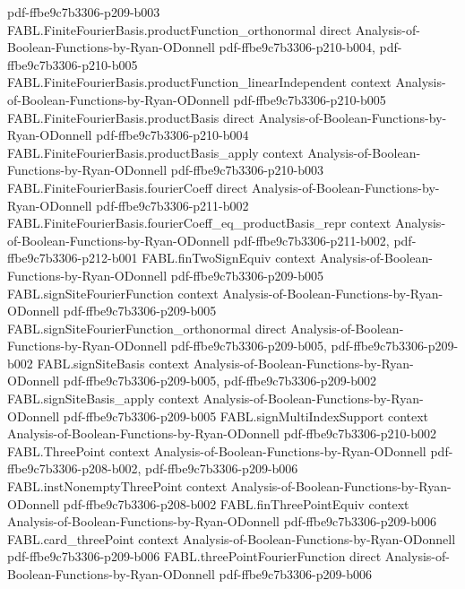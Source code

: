 \begin{theorem}
  {pdf-ffbe9c7b3306-p209-b003}
\proofstep
  {FABL.FiniteFourierBasis.productFunction_orthonormal}
  {direct}
  {Analysis-of-Boolean-Functions-by-Ryan-ODonnell}
  {pdf-ffbe9c7b3306-p210-b004,
    pdf-ffbe9c7b3306-p210-b005}
\proofstep
  {FABL.FiniteFourierBasis.productFunction_linearIndependent}
  {context}
  {Analysis-of-Boolean-Functions-by-Ryan-ODonnell}
  {pdf-ffbe9c7b3306-p210-b005}
\proofstep
  {FABL.FiniteFourierBasis.productBasis}
  {direct}
  {Analysis-of-Boolean-Functions-by-Ryan-ODonnell}
  {pdf-ffbe9c7b3306-p210-b004}
\proofstep
  {FABL.FiniteFourierBasis.productBasis_apply}
  {context}
  {Analysis-of-Boolean-Functions-by-Ryan-ODonnell}
  {pdf-ffbe9c7b3306-p210-b003}
\proofstep
  {FABL.FiniteFourierBasis.fourierCoeff}
  {direct}
  {Analysis-of-Boolean-Functions-by-Ryan-ODonnell}
  {pdf-ffbe9c7b3306-p211-b002}
\proofstep
  {FABL.FiniteFourierBasis.fourierCoeff_eq_productBasis_repr}
  {context}
  {Analysis-of-Boolean-Functions-by-Ryan-ODonnell}
  {pdf-ffbe9c7b3306-p211-b002,
    pdf-ffbe9c7b3306-p212-b001}
\proofstep
  {FABL.finTwoSignEquiv}
  {context}
  {Analysis-of-Boolean-Functions-by-Ryan-ODonnell}
  {pdf-ffbe9c7b3306-p209-b005}
\proofstep
  {FABL.signSiteFourierFunction}
  {context}
  {Analysis-of-Boolean-Functions-by-Ryan-ODonnell}
  {pdf-ffbe9c7b3306-p209-b005}
\proofstep
  {FABL.signSiteFourierFunction_orthonormal}
  {direct}
  {Analysis-of-Boolean-Functions-by-Ryan-ODonnell}
  {pdf-ffbe9c7b3306-p209-b005,
    pdf-ffbe9c7b3306-p209-b002}
\proofstep
  {FABL.signSiteBasis}
  {context}
  {Analysis-of-Boolean-Functions-by-Ryan-ODonnell}
  {pdf-ffbe9c7b3306-p209-b005,
    pdf-ffbe9c7b3306-p209-b002}
\proofstep
  {FABL.signSiteBasis_apply}
  {context}
  {Analysis-of-Boolean-Functions-by-Ryan-ODonnell}
  {pdf-ffbe9c7b3306-p209-b005}
\proofstep
  {FABL.signMultiIndexSupport}
  {context}
  {Analysis-of-Boolean-Functions-by-Ryan-ODonnell}
  {pdf-ffbe9c7b3306-p210-b002}
\proofstep
  {FABL.ThreePoint}
  {context}
  {Analysis-of-Boolean-Functions-by-Ryan-ODonnell}
  {pdf-ffbe9c7b3306-p208-b002,
    pdf-ffbe9c7b3306-p209-b006}
\proofstep
  {FABL.instNonemptyThreePoint}
  {context}
  {Analysis-of-Boolean-Functions-by-Ryan-ODonnell}
  {pdf-ffbe9c7b3306-p208-b002}
\proofstep
  {FABL.finThreePointEquiv}
  {context}
  {Analysis-of-Boolean-Functions-by-Ryan-ODonnell}
  {pdf-ffbe9c7b3306-p209-b006}
\proofstep
  {FABL.card_threePoint}
  {context}
  {Analysis-of-Boolean-Functions-by-Ryan-ODonnell}
  {pdf-ffbe9c7b3306-p209-b006}
\proofstep
  {FABL.threePointFourierFunction}
  {direct}
  {Analysis-of-Boolean-Functions-by-Ryan-ODonnell}
  {pdf-ffbe9c7b3306-p209-b006}

\end{theorem}
